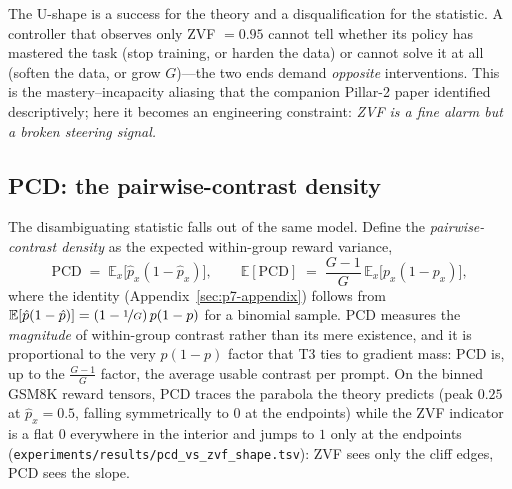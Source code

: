 \documentclass{article}
\newcommand{\E}{\mathbb{E}}
\begin{document}
The U-shape is a success for the theory and a disqualification for the
statistic. A controller that observes only ZVF $= 0.95$ cannot tell whether
its policy has mastered the task (stop training, or harden the data) or
cannot solve it at all (soften the data, or grow $G$)---the two ends demand
\emph{opposite} interventions. This is the mastery--incapacity aliasing that
the companion Pillar-2 paper identified descriptively; here it becomes an
engineering constraint: \emph{ZVF is a fine alarm but a broken steering
signal.}

\subsection{PCD: the pairwise-contrast density}
\label{sec:p7-pcd}
The disambiguating statistic falls out of the same model. Define the
\emph{pairwise-contrast density} as the expected within-group reward
variance,
\begin{equation}
  \mathrm{PCD} \;=\; \E_x\bigl[\hat p_x(1 - \hat p_x)\bigr],
  \qquad
  \E[\mathrm{PCD}] \;=\; \frac{G-1}{G}\,\E_x\bigl[p_x(1-p_x)\bigr],
  \label{eq:p7-pcd}
\end{equation}
where the identity (Appendix~\ref{sec:p7-appendix}) follows from
$\E[\hat p(1-\hat p)] = (1 - \nicefrac{1}{G})\,p(1-p)$ for a binomial
sample. PCD measures the \emph{magnitude} of within-group contrast rather
than its mere existence, and it is proportional to the very $p(1-p)$ factor
that T3 ties to gradient mass: PCD is, up to the $\frac{G-1}{G}$ factor, the
average usable contrast per prompt. On the binned GSM8K reward tensors, PCD
traces the parabola the theory predicts (peak $0.25$ at $\hat p_x = 0.5$,
falling symmetrically to $0$ at the endpoints) while the ZVF indicator is a
flat $0$ everywhere in the interior and jumps to $1$ only at the endpoints
(\texttt{experiments/results/pcd\_vs\_zvf\_shape.tsv}): ZVF sees only the
cliff edges, PCD sees the slope.
\end{document}
